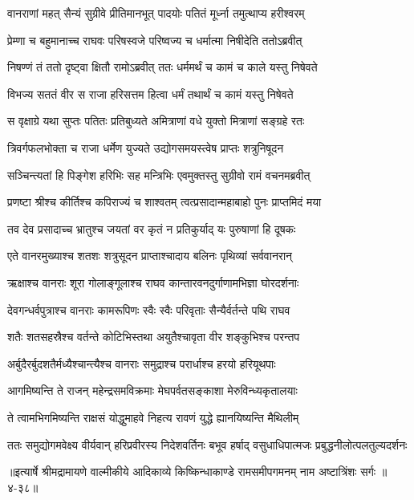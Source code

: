 \twolineshloka
{वानराणां महत् सैन्यं सुग्रीवे प्रीतिमानभूत्}
{पादयोः पतितं मूर्ध्ना तमुत्थाप्य हरीश्वरम्} %

\twolineshloka
{प्रेम्णा च बहुमानाच्च राघवः परिषस्वजे}
{परिष्वज्य च धर्मात्मा निषीदेति ततोऽब्रवीत्} %

\twolineshloka
{निषण्णं तं ततो दृष्ट्वा क्षितौ रामोऽब्रवीत् ततः}
{धर्ममर्थं च कामं च काले यस्तु निषेवते} %

\twolineshloka
{विभज्य सततं वीर स राजा हरिसत्तम}
{हित्वा धर्मं तथार्थं च कामं यस्तु निषेवते} %

\twolineshloka
{स वृक्षाग्रे यथा सुप्तः पतितः प्रतिबुध्यते}
{अमित्राणां वधे युक्तो मित्राणां सङ्ग्रहे रतः} %

\twolineshloka
{त्रिवर्गफलभोक्ता च राजा धर्मेण युज्यते}
{उद्योगसमयस्त्वेष प्राप्तः शत्रुनिषूदन} %

\twolineshloka
{सञ्चिन्त्यतां हि पिङ्गेश हरिभिः सह मन्त्रिभिः}
{एवमुक्तस्तु सुग्रीवो रामं वचनमब्रवीत्} %

\twolineshloka
{प्रणष्टा श्रीश्च कीर्तिश्च कपिराज्यं च शाश्वतम्}
{त्वत्प्रसादान्महाबाहो पुनः प्राप्तमिदं मया} %

\twolineshloka
{तव देव प्रसादाच्च भ्रातुश्च जयतां वर}
{कृतं न प्रतिकुर्याद् यः पुरुषाणां हि दूषकः} %

\twolineshloka
{एते वानरमुख्याश्च शतशः शत्रुसूदन}
{प्राप्ताश्चादाय बलिनः पृथिव्यां सर्ववानरान्} %

\twolineshloka
{ऋक्षाश्च वानराः शूरा गोलाङ्गूलाश्च राघव}
{कान्तारवनदुर्गाणामभिज्ञा घोरदर्शनाः} %

\twolineshloka
{देवगन्धर्वपुत्राश्च वानराः कामरूपिणः}
{स्वैः स्वैः परिवृताः सैन्यैर्वर्तन्ते पथि राघव} %

\twolineshloka
{शतैः शतसहस्रैश्च वर्तन्ते कोटिभिस्तथा}
{अयुतैश्चावृता वीर शङ्कुभिश्च परन्तप} %

\twolineshloka
{अर्बुदैरर्बुदशतैर्मध्यैश्चान्त्यैश्च वानराः}
{समुद्राश्च परार्धाश्च हरयो हरियूथपाः} %

\twolineshloka
{आगमिष्यन्ति ते राजन् महेन्द्रसमविक्रमाः}
{मेघपर्वतसङ्काशा मेरुविन्ध्यकृतालयाः} %

\twolineshloka
{ते त्वामभिगमिष्यन्ति राक्षसं योद्धुमाहवे}
{निहत्य रावणं युद्धे ह्यानयिष्यन्ति मैथिलीम्} %

\twolineshloka
{ततः समुद्योगमवेक्ष्य वीर्यवान् हरिप्रवीरस्य निदेशवर्तिनः}
{बभूव हर्षाद् वसुधाधिपात्मजः प्रबुद्धनीलोत्पलतुल्यदर्शनः} %


॥इत्यार्षे श्रीमद्रामायणे वाल्मीकीये आदिकाव्ये किष्किन्धाकाण्डे रामसमीपगमनम् नाम अष्टात्रिंशः सर्गः ॥४-३८॥
